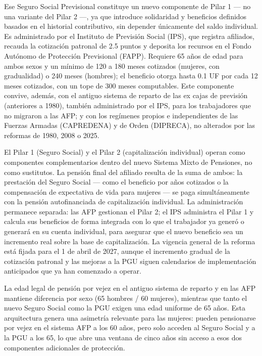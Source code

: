 \documentclass[12pt, letterpaper]{article}
\begin{document}
Ese Seguro Social Previsional constituye un nuevo componente de Pilar 1 --- no una variante del Pilar 2 ---, ya que introduce solidaridad y beneficios definidos basados en el historial contributivo, sin depender únicamente del saldo individual. Es administrado por el Instituto de Previsión Social (IPS), que registra afiliados, recauda la cotización patronal de 2.5 puntos y deposita los recursos en el Fondo Autónomo de Protección Previsional (FAPP). Requiere 65 años de edad para ambos sexos y un mínimo de 120 a 180 meses cotizados (mujeres, con gradualidad) o 240 meses (hombres); el beneficio otorga hasta 0.1 UF por cada 12 meses cotizados, con un tope de 300 meses computables. Este componente convive, además, con el antiguo sistema de reparto de las ex cajas de previsión (anteriores a 1980), también administrado por el IPS, para los trabajadores que no migraron a las AFP; y con los regímenes propios e independientes de las Fuerzas Armadas (CAPREDENA) y de Orden (DIPRECA), no alterados por las reformas de 1980, 2008 o 2025.

El Pilar 1 (Seguro Social) y el Pilar 2 (capitalización individual) operan como componentes complementarios dentro del nuevo Sistema Mixto de Pensiones, no como sustitutos. La pensión final del afiliado resulta de la suma de ambos: la prestación del Seguro Social --- como el beneficio por años cotizados o la compensación de expectativa de vida para mujeres --- se paga simultáneamente con la pensión autofinanciada de capitalización individual. La administración permanece separada: las AFP gestionan el Pilar 2; el IPS administra el Pilar 1 y calcula sus beneficios de forma integrada con lo que el trabajador ya generó o generará en su cuenta individual, para asegurar que el nuevo beneficio sea un incremento real sobre la base de capitalización. La vigencia general de la reforma está fijada para el 1 de abril de 2027, aunque el incremento gradual de la cotización patronal y las mejoras a la PGU siguen calendarios de implementación anticipados que ya han comenzado a operar.

La edad legal de pensión por vejez en el antiguo sistema de reparto y en las AFP mantiene diferencia por sexo (65 hombres / 60 mujeres), mientras que tanto el nuevo Seguro Social como la PGU exigen una edad uniforme de 65 años. Esta arquitectura genera una asimetría relevante para las mujeres: pueden pensionarse por vejez en el sistema AFP a los 60 años, pero solo acceden al Seguro Social y a la PGU a los 65, lo que abre una ventana de cinco años sin acceso a esos dos componentes adicionales de protección.
\end{document}
